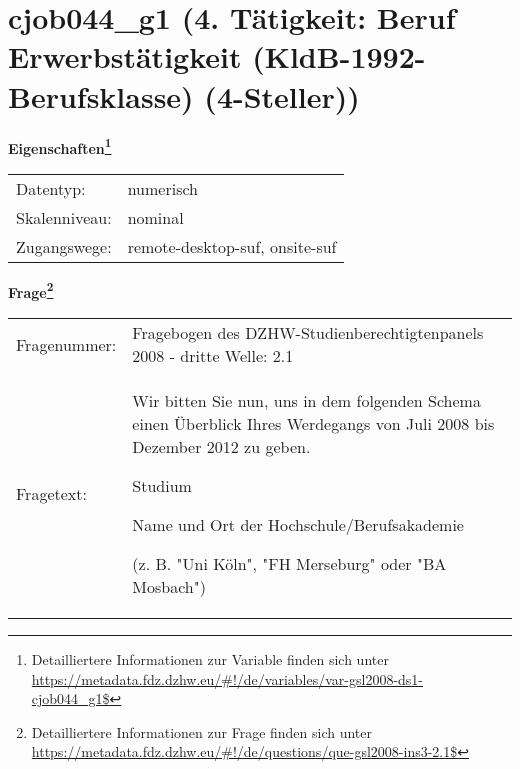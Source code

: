 
    \setcounter{footnote}{0}

    \vspace*{-1.8cm}
	\section{cjob044\_g1 (4. Tätigkeit: Beruf Erwerbstätigkeit (KldB-1992-Berufsklasse) (4-Steller))}
	\label{section:cjob044_g1}



    \vspace*{0.5cm}
    \noindent\textbf{Eigenschaften\footnote{Detailliertere Informationen zur Variable finden sich unter
		\url{https://metadata.fdz.dzhw.eu/\#!/de/variables/var-gsl2008-ds1-cjob044_g1$}}}\\
	\begin{tabularx}{\hsize}{@{}lX}
	Datentyp: & numerisch \\
	Skalenniveau: & nominal \\
	Zugangswege: &
	  remote-desktop-suf, 
	  onsite-suf
 \\
    \end{tabularx}



				\vspace*{0.5cm}
                \noindent\textbf{Frage\footnote{Detailliertere Informationen zur Frage finden sich unter
		              \url{https://metadata.fdz.dzhw.eu/\#!/de/questions/que-gsl2008-ins3-2.1$}}}\\
				\begin{tabularx}{\hsize}{@{}lX}
					Fragenummer: &
					  Fragebogen des DZHW-Studienberechtigtenpanels 2008 - dritte Welle:
					  2.1
 \\
					Fragetext: & Wir bitten Sie nun, uns in dem folgenden Schema einen Überblick Ihres Werdegangs von Juli 2008 bis Dezember 2012 zu geben.\par  Studium\par  Name und Ort der Hochschule/Berufsakademie\par  (z. B. "Uni Köln", "FH Merseburg" oder "BA Mosbach") \\
				\end{tabularx}





